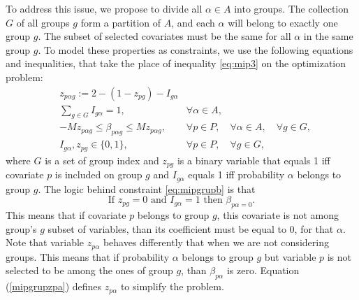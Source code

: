 To address this issue, we propose to divide all $\alpha \in A$ into groups. The collection $G$ of all groups $g$ form a partition of $A$, and each $\alpha$ will belong to exactly one group $g$. 
The subset of selected covariates must be the same for all $\alpha$ in the same group $g$. To model these properties as constraints, we use the following equations and inequalities, that take the place of inequality \ref{eq:mip3} on the optimization problem:
\begin{eqnarray}
&z_{p \alpha g} := 2 - ( 1-z_{pg}) - I_{g\alpha}& \label{mipgrupzpa} \\
& \sum\limits_{g \in G} I_{g\alpha} = 1, & \forall \alpha \in A,\label{eq:mipgrupa} \\
& -Mz_{p \alpha g}  \leq  \beta_{p \alpha g} \leq M z_{p \alpha g}, & \forall p \in P, \quad \forall \alpha \in A, \quad \forall g \in G, \label{eq:mipgrupb} \\
& I_{g\alpha}, z_{pg} \in \{0,1\},& \forall p \in P, \quad \forall g \in G, 
\end{eqnarray}
where $G$ is a set of group index and $z_{pg}$ is a binary variable that equals 1 iff covariate $p$ is included on group $g$ and $I_{g\alpha}$ equals 1 iff probability $\alpha$ belongs to group $g$. 
The logic behind constraint \ref{eq:mipgrupb} is that 
$$\text{If }z_{pg} = 0 \text{ and }I_{g\alpha} =1 \text{ then } \beta_{p \alpha = 0}. $$
This means that if covariate $p$ belongs to group $g$, this covariate is not among group's $g$ subset of variables, than its coefficient must be equal to $0$, for that $\alpha$.
Note that variable $z_{p \alpha}$ behaves differently that when we are not considering groups. This means that if probability $\alpha$ belongs to group $g$ but variable $p$ is not selected to be among the ones of group $g$, than $\beta_{p\alpha}$ is zero.
Equation (\ref{mipgrupzpa}) defines $z_{p\alpha}$ to simplify the problem.

